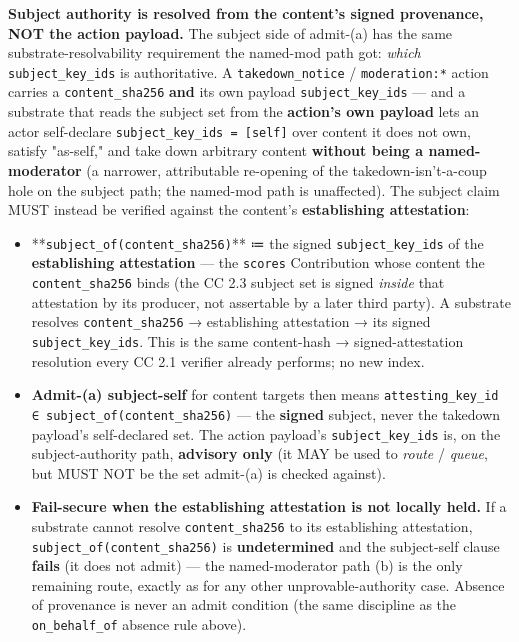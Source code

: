 \documentclass[11pt]{article}
\begin{document}
\textbf{Subject authority is resolved from the content's signed provenance, NOT the action payload.} The subject side of admit-(a) has the same substrate-resolvability requirement the named-mod path got: \textit{which} \texttt{subject\_key\_ids} is authoritative. A \texttt{takedown\_notice} / \texttt{moderation:*} action carries a \texttt{content\_sha256} \textbf{and} its own payload \texttt{subject\_key\_ids} — and a substrate that reads the subject set from the \textbf{action's own payload} lets an actor self-declare \texttt{subject\_key\_ids = [self]} over content it does not own, satisfy "as-self," and take down arbitrary content \textbf{without being a named-moderator} (a narrower, attributable re-opening of the takedown-isn't-a-coup hole on the subject path; the named-mod path is unaffected). The subject claim MUST instead be verified against the content's \textbf{establishing attestation}:


\begin{itemize}\setlength\itemsep{0pt}
\item **\texttt{subject\_of(content\_sha256)}** ≔ the signed \texttt{subject\_key\_ids} of the \textbf{establishing attestation} — the \texttt{scores} Contribution whose content the \texttt{content\_sha256} binds (the CC 2.3 subject set is signed \textit{inside} that attestation by its producer, not assertable by a later third party). A substrate resolves \texttt{content\_sha256} → establishing attestation → its signed \texttt{subject\_key\_ids}. This is the same content-hash → signed-attestation resolution every CC 2.1 verifier already performs; no new index.
\item \textbf{Admit-(a) subject-self} for content targets then means \texttt{attesting\_key\_id ∈ subject\_of(content\_sha256)} — the \textbf{signed} subject, never the takedown payload's self-declared set. The action payload's \texttt{subject\_key\_ids} is, on the subject-authority path, \textbf{advisory only} (it MAY be used to \textit{route} / \textit{queue}, but MUST NOT be the set admit-(a) is checked against).
\item \textbf{Fail-secure when the establishing attestation is not locally held.} If a substrate cannot resolve \texttt{content\_sha256} to its establishing attestation, \texttt{subject\_of(content\_sha256)} is \textbf{undetermined} and the subject-self clause \textbf{fails} (it does not admit) — the named-moderator path (b) is the only remaining route, exactly as for any other unprovable-authority case. Absence of provenance is never an admit condition (the same discipline as the \texttt{on\_behalf\_of} absence rule above).
\end{itemize}
\end{document}
